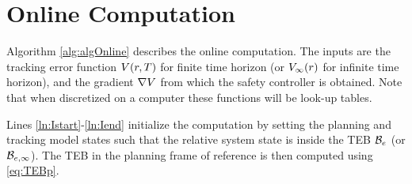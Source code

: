 \section{Online Computation \label{sec:online}}
Algorithm \ref{alg:algOnline} describes the online computation. The inputs are the tracking error function $V(r,T)$ for finite time horizon (or $V_\infty(r)$ for infinite time horizon), and the gradient $\nabla V$ from which the safety controller is obtained. 
Note that when discretized on a computer these functions will be look-up tables.

Lines \ref{ln:Istart}-\ref{ln:Iend} initialize the computation by setting the planning and tracking model states such that the relative system state is inside the TEB $\mathcal B_e$ (or $\mathcal B_{e, \infty}$). 
The TEB in the planning frame of reference is then computed using \eqref{eq:TEBp}. 

